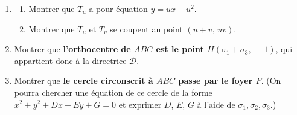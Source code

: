 \begin{enumerate}
  \item
  \begin{enumerate}
    \item Montrer que $T_u$ a pour équation $y=ux-u^2$.
    \item Montrer que $T_u$ et $T_v$ se coupent au point $(u+v,\,uv)$.
  \end{enumerate}
  \item Montrer que \textbf{l'orthocentre de $ABC$ est le point $H(\sigma_1+\sigma_3,\,-1)$}, qui appartient donc à la directrice $\mathcal D$.
  \item Montrer que \textbf{le cercle circonscrit à $ABC$ passe par le foyer $F$}. (On pourra chercher une équation de ce cercle de la forme $x^2+y^2+Dx+Ey+G=0$ et exprimer $D$, $E$, $G$ à l'aide de $\sigma_1,\sigma_2,\sigma_3$.)
\end{enumerate}

